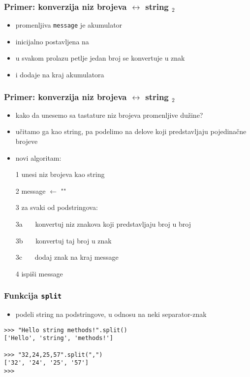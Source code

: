 \documentclass[utf8,compress,aspectratio=169]{beamer}
\begin{document}
\begin{frame}[fragile]
  \frametitle{Primer: konverzija niz brojeva $\leftrightarrow$ string $_2$}
  \begin{itemize}
    \item promenljiva \texttt{message} je akumulator
    \item inicijalno postavljena na 
    \item u svakom prolazu petlje jedan broj se konvertuje u znak
    \item i dodaje na kraj akumulatora
  \end{itemize}
\end{frame}

\begin{frame}[fragile]
  \frametitle{Primer: konverzija niz brojeva $\leftrightarrow$ string $_2$}
  \begin{itemize}
    \item kako da unesemo sa tastature niz brojeva promenljive dužine?
    \item učitamo ga kao string, pa podelimo na delove koji predstavljaju pojedinačne brojeve
    \item novi algoritam:
    \item[1] unesi niz brojeva kao string
    \item[2] message $\leftarrow$ ""
    \item[3] za svaki od podstringova:
    \item[3a] \ \ \ konvertuj niz znakova koji predstavljaju broj u broj
    \item[3b] \ \ \ konvertuj taj broj u znak
    \item[3c] \ \ \ dodaj znak na kraj message
    \item[4] ispiši message
  \end{itemize}
\end{frame}

\begin{frame}[fragile]
  \frametitle{Funkcija \texttt{split}}
  \begin{itemize}
    \item podeli string na podstringove, u odnosu na neki separator-znak
  \end{itemize}
\begin{verbatim}
>>> "Hello string methods!".split()
['Hello', 'string', 'methods!']

>>> "32,24,25,57".split(",")
['32', '24', '25', '57']
>>>
\end{verbatim}
\end{frame}
\end{document}

